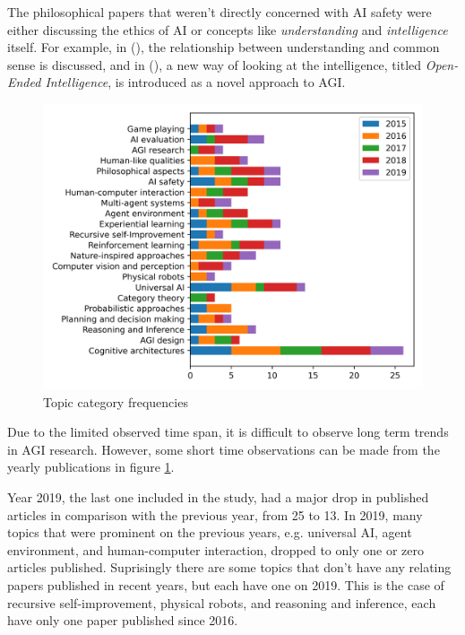\documentclass[utf8,english]{gradu3}
\begin{document}
The philosophical papers that weren't directly concerned with AI safety were
either discussing the ethics of AI or concepts like \emph{understanding} and
\emph{intelligence} itself. For example, in (\cite{thorisson2017understanding}),
the relationship between understanding and common sense is discussed, and in
(\cite[]{weinbaum2016Oopenended}), a new way of looking at the intelligence,
titled \emph{Open-Ended Intelligence}, is introduced as a novel approach to AGI.


\begin{figure}[H]
  \centering
  \includegraphics[scale=0.8]{material/data/topic_frequencies_by_year.png}
  \caption{Topic category frequencies}
  \label{fig:topicbar}
\end{figure}


Due to the limited observed time span, it is difficult to observe long term
trends in AGI research. However, some short time observations can be made from
the yearly publications in figure \ref{fig:topicbar}. 

Year 2019, the last one included in the study, had a major drop in published
articles in comparison with the previous year, from 25 to 13. In 2019, many
topics that were prominent on the previous years, e.g. universal AI, agent
environment, and human-computer interaction, dropped to only one or zero
articles published. Suprisingly there are some topics that don't have any
relating papers published in recent years, but each have one on 2019. This is
the case of recursive self-improvement, physical robots, and reasoning and
inference, each have only one paper published since 2016.
\end{document}
